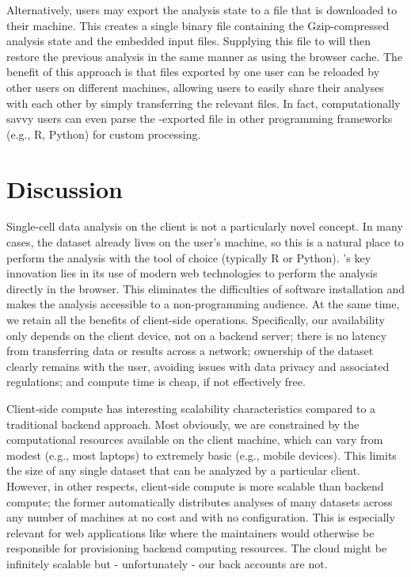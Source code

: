 \documentclass{article}
\begin{document}
Alternatively, users may export the analysis state to a file that is downloaded to their machine.
This creates a single binary file containing the Gzip-compressed analysis state and the embedded input files.
Supplying this file to  will then restore the previous analysis in the same manner as using the browser cache.
The benefit of this approach is that files exported by one user can be reloaded by other users on different machines,
allowing users to easily share their analyses with each other by simply transferring the relevant files.
In fact, computationally savvy users can even parse the -exported file in other programming frameworks (e.g., R, Python) for custom processing.

\section{Discussion}

Single-cell data analysis on the client is not a particularly novel concept.
In many cases, the dataset already lives on the user's machine, so this is a natural place to perform the analysis with the tool of choice (typically R or Python).
's key innovation lies in its use of modern web technologies to perform the analysis directly in the browser.
This eliminates the difficulties of software installation and makes the analysis accessible to a non-programming audience.
At the same time, we retain all the benefits of client-side operations.
Specifically, our availability only depends on the client device, not on a backend server;
there is no latency from transferring data or results across a network;
ownership of the dataset clearly remains with the user, avoiding issues with data privacy and associated regulations;
and compute time is cheap, if not effectively free.

Client-side compute has interesting scalability characteristics compared to a traditional backend approach.
Most obviously, we are constrained by the computational resources available on the client machine,
which can vary from modest (e.g., most laptops) to extremely basic (e.g., mobile devices).
This limits the size of any single dataset that can be analyzed by a particular client.
However, in other respects, client-side compute is more scalable than backend compute;
the former automatically distributes analyses of many datasets across any number of machines at no cost and with no configuration.
This is especially relevant for web applications like  where the maintainers would otherwise be responsible for provisioning backend computing resources.
The cloud might be infinitely scalable but - unfortunately - our back accounts are not.
\end{document}
